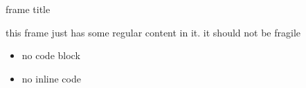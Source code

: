 
\begin{frame}{frame title}

    this frame just has some regular content in it. it should not be fragile

    \begin{itemize}
        \item no code block
        \item no inline code
    \end{itemize}

\end{frame}